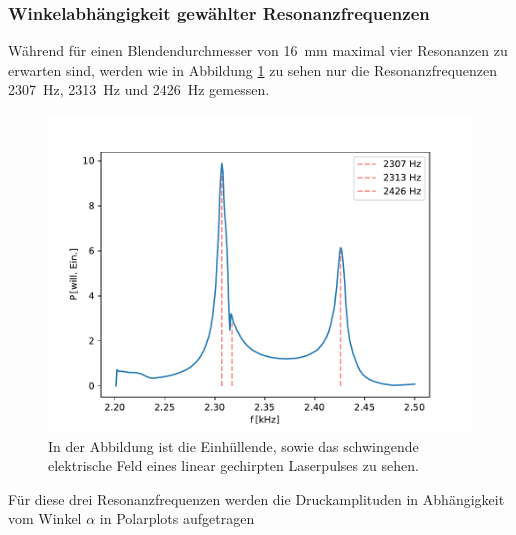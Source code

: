         \subsubsection*{Winkelabhängigkeit gewählter Resonanzfrequenzen}
            Während für einen Blendendurchmesser von \SI{16}{\milli\metre} maximal vier Resonanzen zu erwarten sind, werden wie in Abbildung \ref{fig:hmol_res} zu sehen nur die Resonanzfrequenzen 
            \SI{2307}{\hertz}, \SI{2313}{\hertz} und \SI{2426}{\hertz} gemessen.  
            \begin{figure}[ht]
                \centering
                \includegraphics[scale=0.5]{./pictures/hmol_res.pdf}
                \caption{In der Abbildung ist die Einhüllende, sowie das schwingende elektrische Feld eines linear gechirpten Laserpulses zu sehen.}
                \label{fig:hmol_res}
            \end{figure}
            \FloatBarrier
            Für diese drei Resonanzfrequenzen werden die Druckamplituden in Abhängigkeit vom Winkel $\alpha$ in Polarplots aufgetragen 

